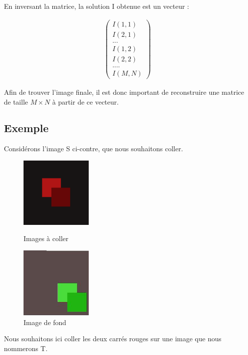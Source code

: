 En inversant la matrice, la solution I obtenue est un vecteur : 
\begin{center}
\begin{equation*}
\left.
\begin{aligned}
\begin{pmatrix}
I(1,1)\\
I(2,1)\\
...\\
I(1,2)\\
I(2,2)\\
....\\
I(M, N)
\end{pmatrix}
\end{aligned}
\right.
\end{equation*}
\end{center}
Afin de trouver l'image finale, il est donc important de reconstruire une matrice de taille $M\times N$ à partir de ce vecteur. 

\subsection{Exemple}
Considérons l'image S ci-contre, que nous souhaitons coller. 
\begin{figure}[!htb]
   \begin{minipage}{0.5\textwidth}
     \centering
     \includegraphics[width = 100pt]{Images/square.png}
     \caption{Images à coller}
      \end{minipage}\hfill
   \begin{minipage}{0.5\textwidth}
     \centering
\includegraphics[width = 100pt]{Images/targer.png}
\caption{Image de fond}
      \end{minipage}\hfill
\end{figure}
Nous souhaitons ici coller les deux carrés rouges sur une image que nous nommerons T.  

